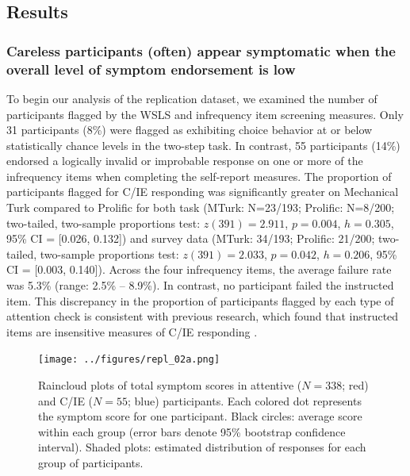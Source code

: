 \documentclass[a4paper,notitlepage,12pt]{article}
\begin{document}
\subsection*{Results}

\subsubsection*{Careless participants (often) appear symptomatic when the overall level of symptom endorsement is low}

To begin our analysis of the replication dataset, we examined the number of participants flagged by the WSLS and infrequency item screening measures. Only 31 participants (8\%) were flagged as exhibiting choice behavior at or below statistically chance levels in the two-step task. In contrast, 55 participants (14\%) endorsed a logically invalid or improbable response on one or more of the infrequency items when completing the self-report measures. The proportion of participants flagged for C/IE responding was significantly greater on Mechanical Turk compared to Prolific for both task (MTurk: N=23/193; Prolific: N=8/200; two-tailed, two-sample proportions test: $z(391)=2.911$, $p=0.004$, $h=0.305$, 95\% CI = [0.026, 0.132]) and survey data (MTurk: 34/193; Prolific: 21/200; two-tailed, two-sample proportions test: $z(391)= 2.033$, $p=0.042$, $h=0.206$, 95\% CI = [0.003, 0.140]). Across the four infrequency items, the average failure rate was 5.3\% (range: 2.5\% -- 8.9\%). In contrast, no participant failed the instructed item. This discrepancy in the proportion of participants flagged by each type of attention check is consistent with previous research, which found that instructed items are insensitive measures of C/IE responding \cite{barends2019noncompliant-2, thomas2017validity-2, hauser2016attentive-2}.   

\begin{figure}[t!]
    \texttt{[image: ../figures/repl\_02a.png]}
    \centering
    \caption{Raincloud plots of total symptom scores in attentive ($N=338$; red) and C/IE ($N=55$; blue) participants. Each colored dot represents the symptom score for one participant. Black circles: average score within each group (error bars denote 95\% bootstrap confidence interval). Shaded plots: estimated distribution of responses for each group of participants.}
    \label{fig:S07}
\end{figure}
\end{document}
